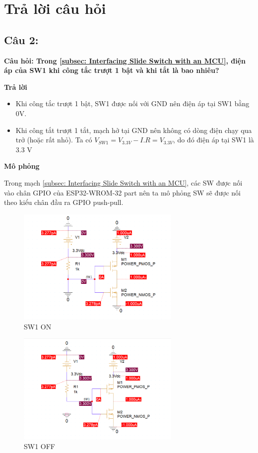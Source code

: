 \section{Trả lời câu hỏi}
\subsection{Câu 2:}
\textbf{Câu hỏi: Trong \ref{subsec: Interfacing Slide Switch with an MCU}, điện áp của SW1 khi công tắc trượt 1 bật và khi tắt là bao nhiêu?}

\textbf{Trả lời}
\begin{itemize}
    \item Khi công tắc trượt 1 bật, SW1 được nối với GND nên điện áp tại SW1 bằng 0V.
    \item Khi công tắt trượt 1 tắt, mạch hở tại GND nên không có dòng điện chạy qua trở (hoặc rất nhỏ). Ta có $V_{SW1} = V_{3.3V} - I.R = V_{3.3V}$, do đó điện áp tại SW1 là 3.3 V 
\end{itemize}

\textbf{Mô phỏng}

Trong mạch \ref{subsec: Interfacing Slide Switch with an MCU}, các SW được nối vào chân GPIO của ESP32-WROM-32 part nên ta mô phỏng SW sẽ được nối theo kiểu chân đầu ra GPIO push-pull.

\begin{figure}[ht]
    \centering
    \includegraphics[width=0.7\textwidth]{graphics/section5/f1.png}
    \caption{SW1 ON}
\end{figure}

\begin{figure}[ht]
    \centering
    \includegraphics[width=0.7\textwidth]{graphics/section5/f2.png}
    \caption{SW1 OFF}
\end{figure}

